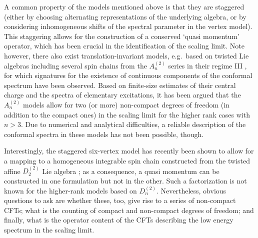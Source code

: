 \documentclass[12pt]{article}
\numberwithin{equation}{section}
\begin{document}
	A common property of the models mentioned above is that they are staggered (either by choosing alternating representations of the underlying algebra, or by considering inhomogeneous shifts of the spectral parameter in the vertex model).  This staggering allows for the construction of a conserved `quasi momentum' operator, which has been crucial in the identification of the scaling limit.  Note however, there also exist translation-invariant models, e.g.\ based on twisted Lie algebras  including several spin chains from the $A^{(2)}_{n}$ series in their regime III \cite{VeJS14,VeJS14a,VeJS16a}, for which signatures for the existence of continuous components of the conformal spectrum have been observed.  Based on finite-size estimates of their central charge and the spectra of elementary excitations, it has been argued that the $A^{(2)}_n$ models allow for two (or more) non-compact degrees of freedom (in addition to the compact ones) in the scaling limit for the higher rank cases with $n>3$.  Due to numerical and analytical difficulties, a reliable description of the conformal spectra in these models has not been possible, though.
	
	Interestingly, the staggered six-vertex model has recently been shown to allow for a mapping to a homogeneous integrable spin chain constructed from the twisted affine $D_2^{(2)}$ Lie algebra \cite{RPJS20}; as a consequence, a quasi momentum can be constructed in one formulation but not in the other.  Such a factorization is not known for the higher-rank models based on $D^{(2)}_{n}$.  Nevertheless, obvious questions to ask are whether these, too, give rise to a series of non-compact CFTs; what is the counting of compact and non-compact degrees of freedom; and finally, what is the operator content of the CFTs describing the low energy spectrum in the scaling limit. 
	
\end{document}
